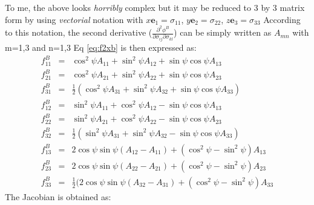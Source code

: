 \documentclass[12pt]{amsart}
\begin{document}
To me, the above looks \emph{horribly} complex but it may be reduced to 3 by 3 matrix form by using \emph{vectorial} notation with $x \boldsymbol{e}_{1}=\sigma_{11}$, $y\boldsymbol{e}_2=\sigma_{22}$, $z\boldsymbol{e}_3=\sigma_{33}$
According to this notation, the second derivative ($\frac{\partial^2\phi^B}{\partial\sigma_{ij}\partial\sigma_{kl}}$) can be simply written as $A_{mn}$ with m=1,3 and n=1,3
Eq \ref{eq:f2xb} is then expressed as:
\begin{eqnarray}
  \label{eq:f2xb_2}
  f^B_{11} &=&            \cos^2\psi A_{11} + \sin^2\psi A_{12} + \sin\psi\cos\psi A_{13}\\
  f^B_{21} &=&            \cos^2\psi A_{21} + \sin^2\psi A_{22} + \sin\psi\cos\psi A_{23}\nonumber\\
  f^B_{31} &=&\frac{1}{2}(\cos^2\psi A_{31} + \sin^2\psi A_{32} + \sin\psi\cos\psi A_{33})\nonumber\\
  f^B_{12} &=&            \sin^2\psi A_{11} + \cos^2\psi A_{12} - \sin\psi\cos\psi A_{13}\nonumber\\
  f^B_{22} &=&            \sin^2\psi A_{21} + \cos^2\psi A_{22} - \sin\psi\cos\psi A_{23}\nonumber\\
  f^B_{32} &=&\frac{1}{2}(\sin^2\psi A_{31} + \sin^2\psi A_{32} - \sin\psi\cos\psi A_{33})\nonumber\\
  f^B_{13} &=&2\cos\psi\sin\psi(A_{12}-A_{11})+(\cos^2\psi-\sin^2\psi) A_{13}\nonumber\\
  f^B_{23} &=&2\cos\psi\sin\psi(A_{22}-A_{21})+(\cos^2\psi-\sin^2\psi) A_{23}\nonumber\\
  f^B_{33} &=& \frac{1}{2}(2\cos\psi\sin\psi(A_{32}-A_{31})+(\cos^2\psi-\sin^2\psi)A_{33}\nonumber
\end{eqnarray}
The Jacobian is obtained as:
\end{document}

